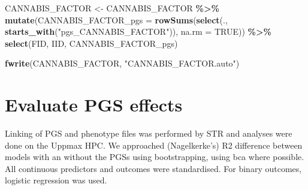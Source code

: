 \documentclass[
]{article}
\newenvironment{Shaded}{\begin{snugshade}}{\end{snugshade}}
\newcommand{\AttributeTok}[1]{\textcolor[rgb]{0.13,0.29,0.53}{#1}}
\newcommand{\ConstantTok}[1]{\textcolor[rgb]{0.56,0.35,0.01}{#1}}
\newcommand{\FunctionTok}[1]{\textcolor[rgb]{0.13,0.29,0.53}{\textbf{#1}}}
\newcommand{\NormalTok}[1]{#1}
\newcommand{\OtherTok}[1]{\textcolor[rgb]{0.56,0.35,0.01}{#1}}
\newcommand{\SpecialCharTok}[1]{\textcolor[rgb]{0.81,0.36,0.00}{\textbf{#1}}}
\newcommand{\StringTok}[1]{\textcolor[rgb]{0.31,0.60,0.02}{#1}}
\begin{document}
\begin{Shaded}
\begin{Highlighting}[]
\NormalTok{CANNABIS\_FACTOR }\OtherTok{\textless{}{-}}\NormalTok{ CANNABIS\_FACTOR }\SpecialCharTok{\%\textgreater{}\%} 
  \FunctionTok{mutate}\NormalTok{(}\AttributeTok{CANNABIS\_FACTOR\_pgs =} \FunctionTok{rowSums}\NormalTok{(}\FunctionTok{select}\NormalTok{(., }\FunctionTok{starts\_with}\NormalTok{(}\StringTok{"pgs\_CANNABIS\_FACTOR"}\NormalTok{)), }\AttributeTok{na.rm =} \ConstantTok{TRUE}\NormalTok{)) }\SpecialCharTok{\%\textgreater{}\%} 
  \FunctionTok{select}\NormalTok{(FID, IID, CANNABIS\_FACTOR\_pgs)}

\FunctionTok{fwrite}\NormalTok{(CANNABIS\_FACTOR, }\StringTok{"CANNABIS\_FACTOR.auto"}\NormalTok{)}
\end{Highlighting}
\end{Shaded}

\hypertarget{evaluate-pgs-effects}{%
\section{Evaluate PGS effects}\label{evaluate-pgs-effects}}

Linking of PGS and phenotype files was performed by STR and analyses
were done on the Uppmax HPC. We approached (Nagelkerke's) R2 difference
between models with an without the PGSs using bootstrapping, using bca
where possible. All continuous predictors and outcomes were
standardised. For binary outcomes, logistic regression was used.
\end{document}

